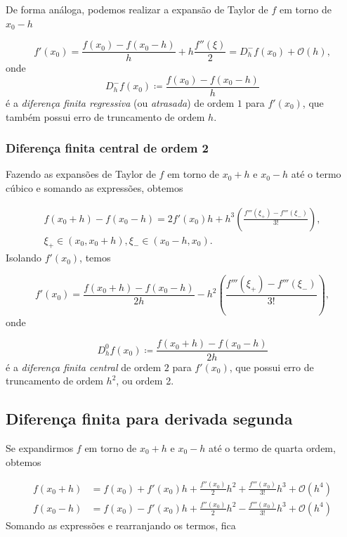 \documentclass{article}
\begin{document}
De forma análoga, podemos realizar a expansão de Taylor de \(f\) em torno de \(x_0-h\)

\begin{equation}
    f'(x_0) = \frac{f(x_0)-f(x_0-h)}{h} + h\frac{f''(\xi)}{2} = D^-_h f(x_0) + \mathcal{O}(h),
\end{equation}
onde \begin{equation}
    D^-_h f(x_0) \coloneq \frac{f(x_0) - f(x_0-h)}{h}
\end{equation}
é a \emph{diferença finita regressiva} (ou \emph{atrasada}) de ordem \(1\) para \(f'(x_0)\), que também possui erro de truncamento de ordem \(h\).

\subsubsection{Diferença finita central de ordem 2}

Fazendo as expansões de Taylor de \(f\) em torno de \(x_0+h\) e \(x_0-h\) até o termo cúbico e somando as expressões, obtemos

\begin{multline}
    f(x_0+h) - f(x_0-h) = 2f'(x_0)h + h^3\left(\frac{f'''(\xi_{+})-f'''(\xi_{-})}{3!}\right), \\
    \xi_{+} \in (x_0, x_0+h), \xi_{-} \in (x_0-h, x_0).
\end{multline}
Isolando \(f'(x_0)\), temos

\begin{equation}
    f'(x_0) = \frac{f(x_0+h) - f(x_0-h)}{2h} - h^2\left(\frac{f'''(\xi_{+})-f'''(\xi_{-})}{3!}\right),
\end{equation}
onde 

\begin{equation}
    D^0_h f(x_0) \coloneq \frac{f(x_0+h) - f(x_0-h)}{2h}
\end{equation}
é a \emph{diferença finita central} de ordem \(2\) para \(f'(x_0)\), que possui erro de truncamento de ordem \(h^2\), ou ordem 2.

\subsection{Diferença finita para derivada segunda}

Se expandirmos \(f\) em torno de \(x_0+h\) e \(x_0-h\) até o termo de quarta ordem, obtemos

\begin{align}
    f(x_0+h) & = f(x_0) + f'(x_0)h + \frac{f''(x_0)}{2}h^2 + \frac{f'''(x_0)}{3!}h^3 + \mathcal{O}(h^4) \\
    f(x_0-h) & = f(x_0) - f'(x_0)h + \frac{f''(x_0)}{2}h^2 - \frac{f'''(x_0)}{3!}h^3 + \mathcal{O}(h^4)
\end{align}
Somando as expressões e rearranjando os termos, fica
\end{document}
